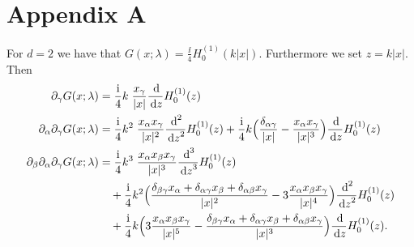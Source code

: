 \chapter*{Appendix A}

For $d = 2$ we have that $G(x; \lambda) = \frac{\ii}{4} H_0^{(1)}(k|x|)$.
Furthermore we set $z =  k|x|$.  
Then
\begin{align*}
  \partial_\gamma G(x; \lambda) &= \frac{\ii}{4} k\;  \frac{x_\gamma}{|x|} \frac{\d{}}{\d z} H_0^{(1)}(z) \\
  \partial_\alpha \partial_\gamma G(x; \lambda) 
  &= \frac{\ii}{4} k^2 \;  \frac{x_\alpha x_\gamma}{|x|^2} \frac{\d{}^2}{\d z^2} H_0^{(1)}(z) + \frac{\ii}{4} k \Big(\frac{\delta_{\alpha\gamma}}{|x|} - \frac{x_\alpha x_\gamma}{|x|^3} \Big) \frac{\d{}}{\d z} H_0^{(1)}(z) \\
  \partial_\beta \partial_\alpha \partial_\gamma G(x; \lambda)
  &= \frac{\ii}{4} k^3 \; \frac{x_\alpha x_\beta x_\gamma}{|x|^3} \frac{\d{}^3}{\d z^3} H_0^{(1)}(z) \\
  &\quad + \frac{\ii}{4} k^2 \Big(\frac{\delta_{\beta\gamma} x_\alpha + \delta_{\alpha \gamma} x_\beta + \delta_{\alpha \beta} x_\gamma}{|x|^2} - 3 \frac{x_\alpha x_\beta x_\gamma}{|x|^4} \Big) \frac{\d{}^2}{\d z^2} H_0^{(1)}(z) \\
  &\quad + \frac{\ii}{4} k \Big( 3 \frac{x_\alpha x_\beta x_\gamma}{|x|^5} - \frac{\delta_{\beta\gamma} x_\alpha + \delta_{\alpha\gamma} x_\beta + \delta_{\alpha\beta} x_\gamma}{|x|^3} \Big) \frac{\d{}}{\d z} H_0^{(1)}(z).
\end{align*}

